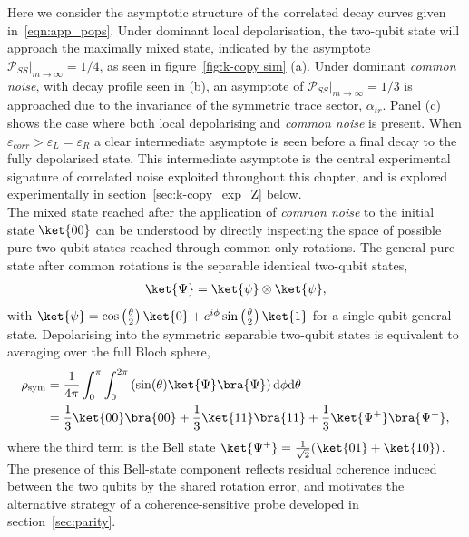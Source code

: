 Here we consider the asymptotic structure of the correlated decay curves given in~\ref{eqn:app_pops}. Under dominant local depolarisation, the two-qubit state will approach the maximally mixed state, indicated by the asymptote
$\mathcal{P}_{SS}|_{m\to\infty} = 1/4$, as seen in figure~\ref{fig:k-copy sim} (a).
Under dominant \emph{common noise}, with decay profile seen in (b), an asymptote of
$\mathcal{P}_{SS}|_{m\to\infty} = 1/3$ is approached due to the invariance of the symmetric trace sector, $\alpha_{tr}$.
Panel (c) shows the case where both local depolarising and \emph{common noise} is present. When $\varepsilon_{corr}>\varepsilon_{L}=\varepsilon_{R}$ a clear intermediate asymptote is seen before a final decay to
the fully depolarised state. This intermediate asymptote is the central
experimental signature of correlated noise exploited throughout this
chapter, and is explored experimentally in section~\ref{sec:k-copy_exp_Z} below.
\\
The mixed state reached after the application of \emph{common noise} to the initial state $\ket{00}$ can be understood by directly inspecting the space of possible pure two qubit states reached through common only rotations. The general pure state after common rotations is the separable identical two-qubit states,
\begin{equation}
\begin{split}
\ket{\Psi} &=\ket{\psi}\otimes\ket{\psi},\\
\end{split}
\end{equation}
with $\ket{\psi}=\cos\left(\frac{\theta}{2}\right)\ket{0}+e^{i\phi}\sin\left(\frac{\theta}{2}\right)\ket{1}$ for a single qubit general state.
Depolarising into the symmetric separable two-qubit states is equivalent to averaging over the full Bloch sphere,
\begin{equation}
    \label{eqn:rho_sym}
\begin{split}
    \rho_\mathrm{sym}&=\frac{1}{4\pi}\int_0^\pi\int_0^{2\pi}\left(\sin(\theta)\ket{\Psi}\bra{\Psi}\right)\mathrm{d}\phi\mathrm{d}\theta\\
    &=\frac{1}{3}\ket{00}\bra{00}+\frac{1}{3}\ket{11}\bra{11}+\frac{1}{3}\ket{\Psi^+}\bra{\Psi^+},
    \end{split}
\end{equation}
where the third term is the Bell state $\ket{\Psi^+} = \frac{1}{\sqrt{2}}(\ket{01}+\ket{10})$.
The presence of this Bell-state component reflects residual coherence
induced between the two qubits by the shared rotation error, and motivates
the alternative strategy of a coherence-sensitive probe developed in
section~\ref{sec:parity}.


